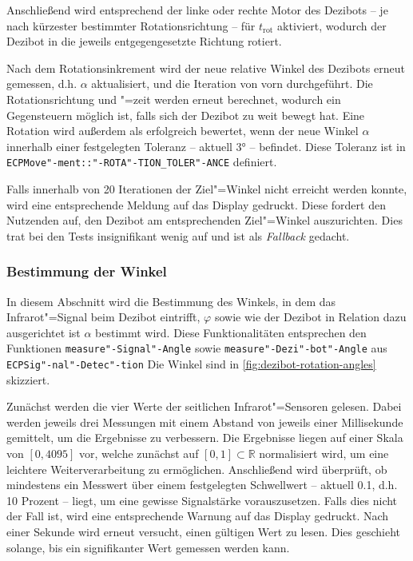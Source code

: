 Anschließend wird entsprechend der linke oder rechte Motor des Dezibots -- je nach kürzester bestimmter Rotationsrichtung -- für $t_{\text{rot}}$ aktiviert, wodurch der Dezibot in die jeweils entgegengesetzte Richtung rotiert.

Nach dem Rotationsinkrement wird der neue relative Winkel des Dezibots erneut gemessen, d.h. $\alpha$ aktualisiert, und die Iteration von vorn durchgeführt. Die Rotationsrichtung und "=zeit werden erneut berechnet, wodurch ein Gegensteuern möglich ist, falls sich der Dezibot zu weit bewegt hat. Eine Rotation wird außerdem als erfolgreich bewertet, wenn der neue Winkel $\alpha$ innerhalb einer festgelegten Toleranz -- aktuell 3° -- befindet. Diese Toleranz ist in \texttt{ECPMove"-ment::"-ROTA"-TION\_TOLER"-ANCE} definiert.

Falls innerhalb von 20 Iterationen der Ziel"=Winkel nicht erreicht werden konnte, wird eine entsprechende Meldung auf das Display gedruckt. Diese fordert den Nutzenden auf, den Dezibot am entsprechenden Ziel"=Winkel auszurichten. Dies trat bei den Tests insignifikant wenig auf und ist als \emph{Fallback} gedacht.


\subsubsection{Bestimmung der Winkel}
\label{sec:angle-determination}

In diesem Abschnitt wird die Bestimmung des Winkels, in dem das Infrarot"=Signal beim Dezibot eintrifft, $\varphi$ sowie wie der Dezibot in Relation dazu ausgerichtet ist $\alpha$ bestimmt wird. Diese Funktionalitäten entsprechen den Funktionen \texttt{measure"-Signal"-Angle} sowie \texttt{measure"-Dezi"-bot"-Angle} aus \texttt{ECPSig"-nal"-Detec"-tion} Die Winkel sind in \autoref{fig:dezibot-rotation-angles} skizziert.

Zunächst werden die vier Werte der seitlichen Infrarot"=Sensoren gelesen. Dabei werden jeweils drei Messungen mit einem Abstand von jeweils einer Millisekunde gemittelt, um die Ergebnisse zu verbessern. Die Ergebnisse liegen auf einer Skala von $[0,4095]$ vor, welche zunächst auf $[0,1] \subset \mathbb{R}$ normalisiert wird, um eine leichtere Weiterverarbeitung zu ermöglichen. Anschließend wird überprüft, ob mindestens ein Messwert über einem festgelegten Schwellwert -- aktuell 0.1, d.h. 10 Prozent -- liegt, um eine gewisse Signalstärke vorauszusetzen. Falls dies nicht der Fall ist, wird eine entsprechende Warnung auf das Display gedruckt. Nach einer Sekunde wird erneut versucht, einen gültigen Wert zu lesen. Dies geschieht solange, bis ein signifikanter Wert gemessen werden kann.

